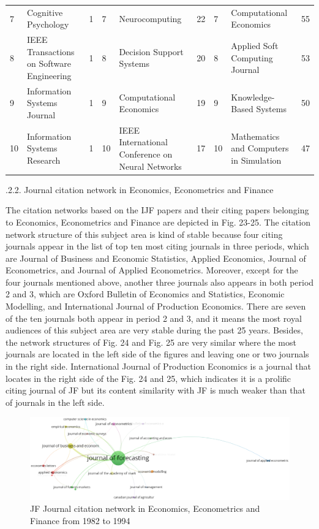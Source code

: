 \documentclass[11pt,a4paper]{elsarticle} %
\begin{document}
\begin{landscape}
\begin{table}[!htbp]
{\begin{tabular}{p{1.5cm}<{\centering} p{6cm}<{\centering} p{1.5cm}<{\centering}|p{1.5cm}<{\centering} p{6cm}<{\centering} p{1.5cm}<{\centering}|p{1.5cm}<{\centering} p{6cm}<{\centering} p{1.5cm}<{\centering}}
7 & Cognitive Psychology & 1 & 7 & Neurocomputing & 22 & 7 & Computational Economics & 55\\
8 & IEEE Transactions on Software Engineering & 1 & 8 & Decision Support Systems & 20 & 8 & Applied Soft Computing Journal & 53\\
9 & Information Systems Journal & 1 & 9 & Computational Economics & 19 & 9 & Knowledge-Based Systems & 50\\
10 & Information Systems Research & 1 & 10 & IEEE International Conference on Neural Networks & 17 & 10 & Mathematics and Computers in Simulation & 47\\
  \hline
  \hline
    \end{tabular}}
\end{table}
\end{landscape}

.2.2. Journal citation network in Economics, Econometrics
and Finance

The citation networks based on the IJF papers and their citing papers
belonging to Economics, Econometrics and Finance are depicted in Fig.
23-25. The citation network structure of this subject area is kind of
stable because four citing journals appear in the list of top ten most
citing journals in three periods, which are Journal of Business and
Economic Statistics, Applied Economics, Journal of Econometrics, and
Journal of Applied Econometrics. Moreover, except for the four journals
mentioned above, another three journals also appears in both period 2
and 3, which are Oxford Bulletin of Economics and Statistics, Economic
Modelling, and International Journal of Production Economics. There are
seven of the ten journals both appear in period 2 and 3, and it means
the most royal audiences of this subject area are very stable during the
past 25 years. Besides, the network structures of Fig. 24 and Fig. 25
are very similar where the most journals are located in the left side of
the figures and leaving one or two journals in the right side.
International Journal of Production Economics is a journal that locates
in the right side of the Fig. 24 and 25, which indicates it is a
prolific citing journal of JF but its content similarity with JF is much
weaker than that of journals in the left side.

\begin{figure}[htbp]
\centering
\includegraphics[scale=0.3]{fig.23.eps}
\caption{JF Journal citation network in Economics, Econometrics and Finance from 1982 to 1994}
\end{figure}
\end{document}
